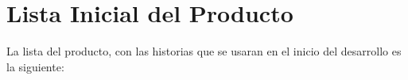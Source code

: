 \section{Lista Inicial del Producto}

La lista del producto, con las historias que se usaran en el inicio del desarrollo es la siguiente:\\




\newpage

\newpage

\newpage

\newpage

\newpage

\newpage
